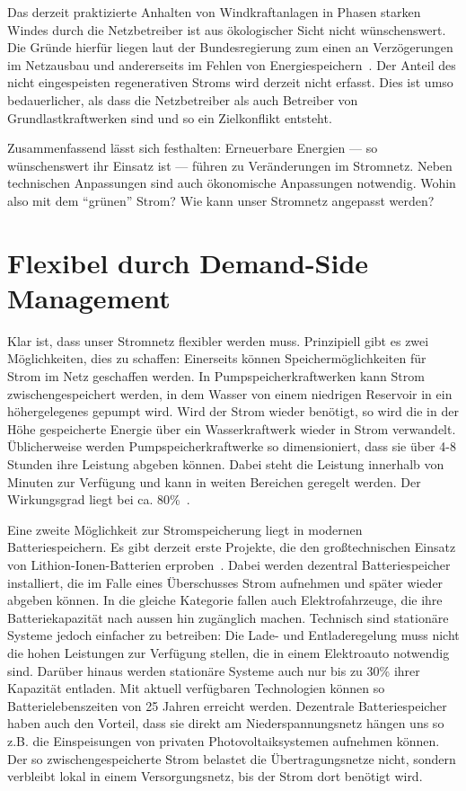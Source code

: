 \documentclass[12pt,BCOR=8.5mm]{scrartcl}
\begin{document}
Das derzeit praktizierte Anhalten von Windkraftanlagen in Phasen starken
Windes durch die Netzbetreiber ist aus ökologischer Sicht nicht
wünschenswert. Die Gründe hierfür liegen laut der Bundesregierung zum
einen an Verzögerungen im Netzausbau und andererseits im Fehlen von
Energiespeichern~\cite{bundesreg2010kleineanfrage}. Der Anteil des nicht
eingespeisten regenerativen Stroms wird derzeit nicht erfasst. Dies ist
umso bedauerlicher, als dass die Netzbetreiber als auch Betreiber von
Grundlastkraftwerken sind und so ein Zielkonflikt entsteht.

Zusammenfassend lässt sich festhalten: Erneuerbare Energien --- so
wünschenswert ihr Einsatz ist --- führen zu Veränderungen im Stromnetz.
Neben technischen Anpassungen sind auch ökonomische Anpassungen
notwendig. Wohin also mit dem "`grünen"' Strom? Wie kann unser Stromnetz
angepasst werden?

\section{Flexibel durch Demand-Side Management}\label{sec:demand-side_management}

Klar ist, dass unser Stromnetz flexibler werden muss. Prinzipiell gibt
es zwei Möglichkeiten, dies zu schaffen: Einerseits können
Speichermöglichkeiten für Strom im Netz geschaffen werden. In
Pumpspeicherkraftwerken kann Strom zwischengespeichert werden, in dem
Wasser von einem niedrigen Reservoir in ein höhergelegenes gepumpt wird.
Wird der Strom wieder benötigt, so wird die in der Höhe gespeicherte
Energie über ein Wasserkraftwerk wieder in Strom verwandelt.
Üblicherweise werden Pumpspeicherkraftwerke so dimensioniert, dass sie
über 4-8 Stunden ihre Leistung abgeben können. Dabei steht die Leistung
innerhalb von Minuten zur Verfügung und kann in weiten Bereichen
geregelt werden. Der Wirkungsgrad liegt
bei ca. 80\%~\cite{wikipedia10pumpspeicher}.

Eine zweite Möglichkeit zur Stromspeicherung liegt in modernen
Batteriespeichern. Es gibt derzeit erste Projekte, die den
großtechnischen Einsatz von Lithion-Ionen-Batterien
erproben~\cite{braun09lithium}. Dabei werden dezentral Batteriespeicher
installiert, die im Falle eines Überschusses Strom aufnehmen und später
wieder abgeben können. In die gleiche Kategorie fallen auch
Elektrofahrzeuge, die ihre Batteriekapazität nach aussen hin zugänglich
machen. Technisch sind stationäre Systeme jedoch einfacher zu betreiben:
Die Lade- und Entladeregelung muss nicht die hohen Leistungen zur
Verfügung stellen, die in einem Elektroauto notwendig sind. Darüber
hinaus werden stationäre Systeme auch nur bis zu 30\% ihrer Kapazität
entladen. Mit aktuell verfügbaren Technologien können so
Batterielebenszeiten von 25 Jahren erreicht werden. Dezentrale
Batteriespeicher haben auch den Vorteil, dass sie direkt am
Niederspannungsnetz hängen uns so z.B. die Einspeisungen von privaten
Photovoltaiksystemen aufnehmen können. Der so zwischengespeicherte Strom
belastet die Übertragungsnetze nicht, sondern verbleibt lokal in einem
Versorgungsnetz, bis der Strom dort benötigt wird.
\end{document}
